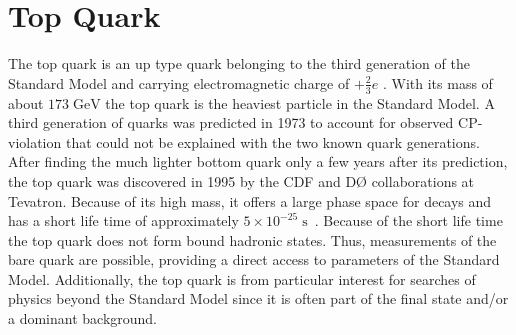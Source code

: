 		
\section{Top Quark}
	The top quark is an up type quark belonging to the third generation of the Standard Model and carrying electromagnetic charge of $+\frac{2}{3}e$ \cite{pdg2016}. With its mass of about $173\;\text{GeV}$ the top quark is the heaviest particle in the Standard Model. A third generation of quarks was predicted in 1973 \cite{topPredict} to account for observed CP-violation that could not be explained with the two known quark generations. After finding the much lighter bottom quark only a few years after its prediction, the top quark was discovered in 1995 by the CDF \cite{topCDF} and D\O{} \cite{topD0} collaborations at Tevatron. Because of its high mass, it offers a large phase space for decays and has a short life time of approximately $5 \times 10^{-25}\;\text{s}$~\cite{pdg2016}. Because of the short life time the top quark does not form bound hadronic states. Thus, measurements of the bare quark are possible, providing a direct access to parameters of the Standard Model. Additionally, the top quark is from particular interest for searches of physics beyond the Standard Model since it is often part of the final state and/or a dominant background. 
	
